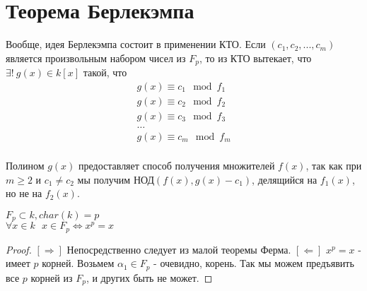 \section{Теорема Берлекэмпа}

Вообще, идея Берлекэмпа состоит в применении КТО. Если $(c_1, c_2, ..., c_m)$ является произвольным набором чисел из $F_p$, то из КТО вытекает, что $\exists!~g(x) \in k[x]$
такой, что 
\[
\begin{array}{l}
g(x) \equiv c_1 \mod f_1 \\
g(x) \equiv c_2 \mod f_2 \\
g(x) \equiv c_3 \mod f_3 \\
\dots \\
g(x) \equiv c_m \mod f_m \\
\end{array}
\]

Полином $g(x)$ предоставляет способ получения множителей $f(x)$, так как при $m \geqslant 2$ и $c_1 \neq c_2$ мы получим
$\text{НОД}(f(x), g(x) - c_1)$, делящийся на $f_1(x)$, но не на $f_2(x)$.

\begin{lem}
$F_p \subset k, char(k) = p$ \\
$\forall x \in k~~~x \in F_p \Leftrightarrow x^p = x $
\end{lem}
\begin{proof}
  $ [\Rightarrow] $ Непосредственно следует из малой теоремы Ферма. \newline
  $ [\Leftarrow] $ $x^p = x$ - имеет $p$ корней. Возьмем $\alpha_1 \in F_p$ - очевидно, корень. Так мы можем предъявить
все $p$ корней из $F_p$, и других быть не может.
\end{proof}

